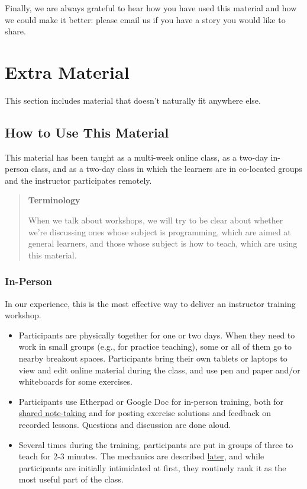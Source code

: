\documentclass[10pt,statementpaper]{memoir}
\begin{document}
Finally, we are always grateful to hear how you have used this material
and how we could make it better: please email us if you have a story you
would like to share.

\chapter{Extra Material}\label{extra-material}

This section includes material that doesn't naturally fit anywhere else.

\section{How to Use This Material}\label{how-to-use-this-material}

This material has been taught as a multi-week online class, as a two-day
in-person class, and as a two-day class in which the learners are in
co-located groups and the instructor participates remotely.

\begin{quote}
\textbf{Terminology}

When we talk about workshops, we will try to be clear about whether
we're discussing ones whose subject is programming, which are aimed at
general learners, and those whose subject is how to teach, which are
using this material.
\end{quote}

\subsection*{In-Person}\label{in-person}

In our experience, this is the most effective way to deliver an
instructor training workshop.

\begin{itemize}
\item
  Participants are physically together for one or two days. When they
  need to work in small groups (e.g., for practice teaching), some or
  all of them go to nearby breakout spaces. Participants bring their own
  tablets or laptops to view and edit online material during the class,
  and use pen and paper and/or whiteboards for some exercises.
\item
  Participants use Etherpad or Google Doc for in-person training, both
  for \href{practices.html\#take-notes-together}{shared note-taking} and
  for posting exercise solutions and feedback on recorded lessons.
  Questions and discussion are done aloud.
\item
  Several times during the training, participants are put in groups of
  three to teach for 2-3 minutes. The mechanics are described
  \href{performance.html\#how-to-practice-teaching}{later}, and while
  participants are initially intimidated at first, they routinely rank
  it as the most useful part of the class.
\end{itemize}
\end{document}
